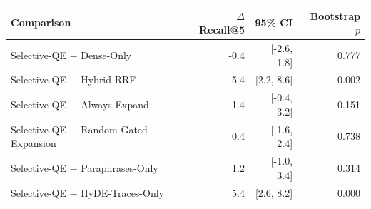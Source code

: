 \begin{tabular}{lrrr}
\toprule
Comparison & $\Delta$ Recall@5 & 95\% CI & Bootstrap $p$ \\
\midrule
Selective-QE $-$ Dense-Only & -0.4 & [-2.6, 1.8] & 0.777 \\
Selective-QE $-$ Hybrid-RRF & 5.4 & [2.2, 8.6] & 0.002 \\
Selective-QE $-$ Always-Expand & 1.4 & [-0.4, 3.2] & 0.151 \\
Selective-QE $-$ Random-Gated-Expansion & 0.4 & [-1.6, 2.4] & 0.738 \\
Selective-QE $-$ Paraphrases-Only & 1.2 & [-1.0, 3.4] & 0.314 \\
Selective-QE $-$ HyDE-Traces-Only & 5.4 & [2.6, 8.2] & 0.000 \\
\bottomrule
\end{tabular}
